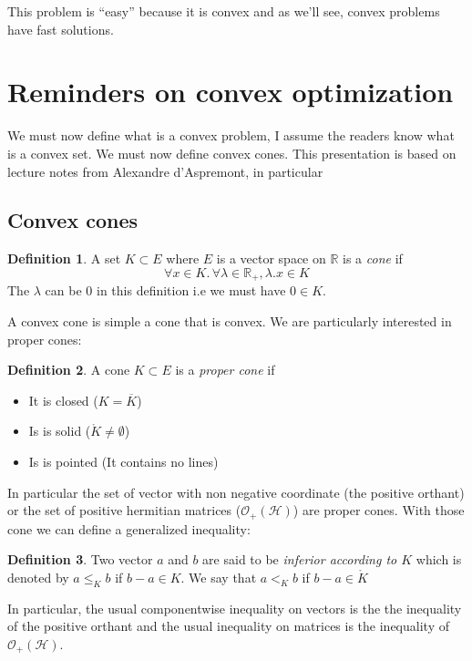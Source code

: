 \documentclass[10pt,a4paper]{report}
\theoremstyle{plain}
\theoremstyle{definition}
\newtheorem{defn}{Definition}[chapter]
\theoremstyle{remark}
\newcommand{\R}{\ensuremath{\mathbb{R}}}
\renewcommand{\leq}{\leqslant}
\begin{document}
This problem is ``easy'' because it is convex and as we'll see, convex problems
have fast solutions.

\section{Reminders on convex optimization}

We must now define what is a convex problem, I assume the readers know what is a
convex set. We must now define convex cones. This presentation is based on
lecture notes from Alexandre d'Aspremont, in particular~\cite{ConvAspr}
\subsection{Convex cones}

\begin{defn}
  A set $K \subset E$ where $E$ is a vector space on $\R$ is a \emph{cone} if
  \[\forall x \in K.\, \forall \lambda \in \R_+, \lambda.x  \in K\]
  The $\lambda$ can be 0 in this definition i.e we must have $0 \in K$.
\end{defn}

A convex cone is simple a cone that is convex. We are particularly interested in
proper cones:

\begin{defn}
  A cone $K \subset E$ is a \emph{proper cone} if
  \begin{itemize}
    \item It is closed ($K = \overline K$)
    \item Is is solid ($ \mathring K \neq \emptyset$)
    \item Is is pointed (It contains no lines)
  \end{itemize}
\end{defn}

In particular the set of vector with non negative coordinate (the positive orthant) or the set of
positive hermitian matrices ($\mathcal{O}_+(\mathcal{H})$) are proper cones. With those cone we can define a
generalized inequality:

\begin{defn}
  Two vector $a$ and $b$ are said to be \emph{inferior according to $K$} which is denoted by $a
  \leq_K b$ if $b - a \in K$. We say that $a <_K b$ if $b - a \in \mathring K$
\end{defn}

In particular, the usual componentwise inequality on vectors is the the
inequality of the positive orthant and the usual inequality on matrices is the
inequality of $\mathcal{O}_+(\mathcal{H})$.
\end{document}
